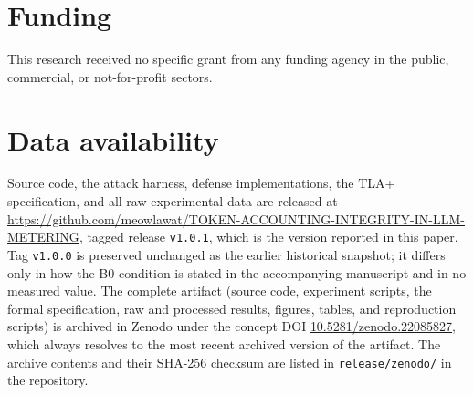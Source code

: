 \documentclass[preprint,3p,authoryear,12pt]{elsarticle}
\begin{document}
\section*{Funding}
This research received no specific grant from any funding agency in the public,
commercial, or not-for-profit sectors.

\section*{Data availability}
Source code, the attack harness, defense implementations, the TLA+ specification, and all
raw experimental data are released at
\url{https://github.com/meowlawat/TOKEN-ACCOUNTING-INTEGRITY-IN-LLM-METERING}, tagged
release \texttt{v1.0.1}, which is the version reported in this paper. Tag
\texttt{v1.0.0} is preserved unchanged as the earlier historical snapshot; it differs only
in how the B0 condition is stated in the accompanying manuscript and in no measured value.
The complete artifact (source code, experiment scripts, the formal
specification, raw and processed results, figures, tables, and reproduction scripts)
is archived in Zenodo under the concept DOI
\href{https://doi.org/10.5281/zenodo.22085827}{10.5281/zenodo.22085827}, which always
resolves to the most recent archived version of the artifact. The archive contents and their SHA-256 checksum are listed in
\texttt{release/zenodo/} in the repository.
\end{document}
